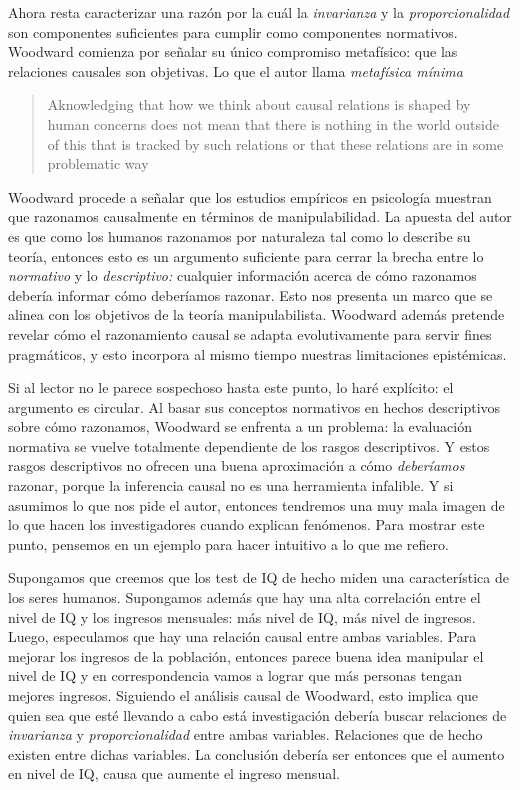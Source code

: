 Ahora resta caracterizar una razón por la cuál la
\emph{invarianza} y la \emph{proporcionalidad} son
componentes suficientes para cumplir como componentes
normativos. Woodward comienza por señalar su único
compromiso metafísico: que las relaciones causales son
objetivas. Lo que el autor llama \emph{metafísica mínima}

 \begin{quote}
    Aknowledging that how we think about causal relations is
    shaped by human concerns does not mean that there is
    nothing in the world outside of this that is tracked by
    such relations or that these relations are  in some problematic way
    \parencite[p.~12]{caushuman}
  \end{quote}


Woodward procede a señalar que los estudios empíricos en
psicología muestran que razonamos causalmente en términos de
manipulabilidad. La apuesta del autor es que como los
humanos razonamos por naturaleza tal como lo describe su
teoría, entonces esto es un argumento suficiente para cerrar
la brecha entre lo \emph{normativo} y lo \emph{descriptivo:}
cualquier información acerca de cómo razonamos debería
informar cómo deberíamos razonar. Esto nos presenta un
marco que se alinea con los objetivos de la teoría
manipulabilista. Woodward además pretende revelar cómo el
razonamiento causal se adapta evolutivamente para servir
fines pragmáticos, y esto incorpora al mismo tiempo
nuestras limitaciones epistémicas.

Si al lector no le parece sospechoso hasta este punto, lo
haré explícito: el argumento es circular. Al basar sus
conceptos normativos en hechos descriptivos sobre cómo
razonamos, Woodward se enfrenta a un problema: la
evaluación normativa se vuelve totalmente dependiente de los
rasgos descriptivos. Y estos rasgos descriptivos no ofrecen
una buena aproximación a cómo \emph{deberíamos} razonar,
porque la inferencia causal no es una herramienta infalible.
Y si asumimos lo que nos pide el autor, entonces tendremos
una muy mala imagen de lo que hacen los investigadores
cuando explican fenómenos. Para mostrar este punto, pensemos
en un ejemplo para hacer intuitivo a lo que me refiero. 

Supongamos que creemos que los test de IQ de hecho miden una
característica de los seres humanos. Supongamos además que
hay una alta correlación entre el nivel de IQ y los ingresos
mensuales: más nivel de IQ, más nivel de ingresos. Luego,
especulamos que hay una relación causal entre ambas
variables. Para mejorar los ingresos de la población,
entonces parece buena idea manipular el nivel de IQ y en
correspondencia vamos a lograr que más personas tengan
mejores ingresos. Siguiendo el análisis causal de Woodward,
esto implica que quien sea que esté llevando a cabo está
investigación debería buscar relaciones de
\emph{invarianza} y \emph{proporcionalidad} entre ambas
variables. Relaciones que de hecho existen entre dichas
variables. La conclusión debería ser entonces que el aumento
en nivel de IQ, causa que aumente el ingreso mensual.   

